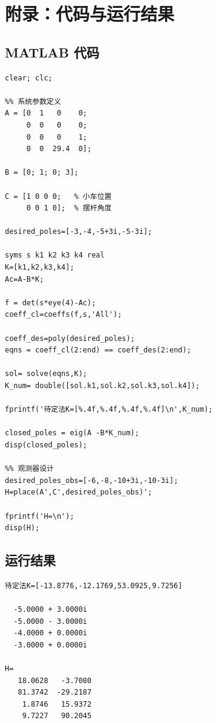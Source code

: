 \documentclass[a4paper, 12pt]{ctexart}
\begin{document}
\newpage
\section*{附录：代码与运行结果}

\subsection*{MATLAB 代码}
\begin{lstlisting}
clear; clc;

%% 系统参数定义
A = [0  1   0    0;
     0  0   0    0;
     0  0   0    1;
     0  0  29.4  0]; 

B = [0; 1; 0; 3];

C = [1 0 0 0;   % 小车位置
     0 0 1 0];  % 摆杆角度

desired_poles=[-3,-4,-5+3i,-5-3i];

syms s k1 k2 k3 k4 real
K=[k1,k2,k3,k4];
Ac=A-B*K;

f = det(s*eye(4)-Ac);
coeff_cl=coeffs(f,s,'All');

coeff_des=poly(desired_poles);
eqns = coeff_cl(2:end) == coeff_des(2:end);

sol= solve(eqns,K);
K_num= double([sol.k1,sol.k2,sol.k3,sol.k4]);

fprintf('待定法K=[%.4f,%.4f,%.4f,%.4f]\n',K_num);

closed_poles = eig(A -B*K_num);
disp(closed_poles); 

%% 观测器设计
desired_poles_obs=[-6,-8,-10+3i,-10-3i];
H=place(A',C',desired_poles_obs)';

fprintf('H=\n');
disp(H);
\end{lstlisting}

\subsection*{运行结果}
\begin{lstlisting}[language={}, frame=none, backgroundcolor=\color{white}]
待定法K=[-13.8776,-12.1769,53.0925,9.7256]

  -5.0000 + 3.0000i
  -5.0000 - 3.0000i
  -4.0000 + 0.0000i
  -3.0000 + 0.0000i

H=
   18.0628   -3.7080
   81.3742  -29.2187
    1.8746   15.9372
    9.7227   90.2045
\end{lstlisting}
\end{document}
